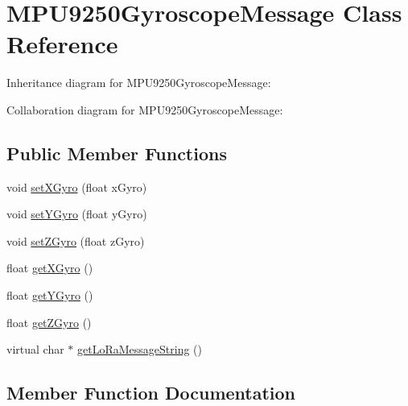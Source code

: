 \hypertarget{class_m_p_u9250_gyroscope_message}{}\section{M\+P\+U9250\+Gyroscope\+Message Class Reference}
\label{class_m_p_u9250_gyroscope_message}


Inheritance diagram for M\+P\+U9250\+Gyroscope\+Message\+:


Collaboration diagram for M\+P\+U9250\+Gyroscope\+Message\+:
\subsection*{Public Member Functions}
\begin{DoxyCompactItemize}
\item 
void \hyperlink{class_m_p_u9250_gyroscope_message_a426d63eba2f68f7eab6818b1bc9b0b34}{set\+X\+Gyro} (float x\+Gyro)
\item 
void \hyperlink{class_m_p_u9250_gyroscope_message_afde14c1771d26d4ddf15059125fdab41}{set\+Y\+Gyro} (float y\+Gyro)
\item 
void \hyperlink{class_m_p_u9250_gyroscope_message_acd03e483a55837340acadc4d3c1cebe6}{set\+Z\+Gyro} (float z\+Gyro)
\item 
float \hyperlink{class_m_p_u9250_gyroscope_message_a4e66bbbed7dbee7bd9ea491e7a437443}{get\+X\+Gyro} ()
\item 
float \hyperlink{class_m_p_u9250_gyroscope_message_a51c89f043ec1962d3e4d2b15604c481d}{get\+Y\+Gyro} ()
\item 
float \hyperlink{class_m_p_u9250_gyroscope_message_a4f3e7815c9533143f347cffdbbd3350c}{get\+Z\+Gyro} ()
\item 
virtual char $\ast$ \hyperlink{class_m_p_u9250_gyroscope_message_ae090d5bd7484413970db2d80929bd0f5}{get\+Lo\+Ra\+Message\+String} ()
\end{DoxyCompactItemize}


\subsection{Member Function Documentation}
\hypertarget{class_m_p_u9250_gyroscope_message_ae090d5bd7484413970db2d80929bd0f5}{}

